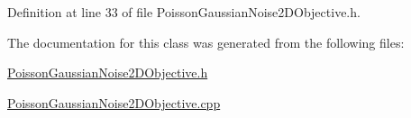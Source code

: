 Definition at line 33 of file Poisson\+Gaussian\+Noise2\+D\+Objective.\+h.



The documentation for this class was generated from the following files\+:\begin{DoxyCompactItemize}
\item 
\hyperlink{PoissonGaussianNoise2DObjective_8h}{Poisson\+Gaussian\+Noise2\+D\+Objective.\+h}\item 
\hyperlink{PoissonGaussianNoise2DObjective_8cpp}{Poisson\+Gaussian\+Noise2\+D\+Objective.\+cpp}\end{DoxyCompactItemize}
